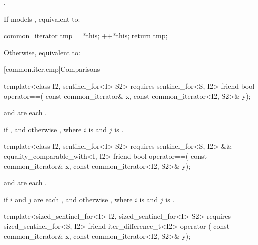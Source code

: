 \begin{itemdescr}
\pnum
\expects
{}.

\pnum
\effects
If  models , equivalent to:
\begin{codeblock}
common_iterator tmp = *this;
++*this;
return tmp;
\end{codeblock}
Otherwise, equivalent to: 
\end{itemdescr}

[common.iter.cmp]{Comparisons}

%
\begin{itemdecl}
template<class I2, sentinel_for<I> S2>
  requires sentinel_for<S, I2>
friend bool operator==(
  const common_iterator& x, const common_iterator<I2, S2>& y);
\end{itemdecl}

\begin{itemdescr}
\pnum
\expects
{} and 
are each .

\pnum
\returns
{} if ,
and otherwise ,
where $i$ is  and $j$ is .
\end{itemdescr}

%
\begin{itemdecl}
template<class I2, sentinel_for<I> S2>
  requires sentinel_for<S, I2> && equality_comparable_with<I, I2>
friend bool operator==(
  const common_iterator& x, const common_iterator<I2, S2>& y);
\end{itemdecl}

\begin{itemdescr}
\pnum
\expects
{} and 
are each .

\pnum
\returns
{} if $i$ and $j$ are each , and otherwise
, where
$i$ is  and $j$ is .
\end{itemdescr}

%
\begin{itemdecl}
template<sized_sentinel_for<I> I2, sized_sentinel_for<I> S2>
  requires sized_sentinel_for<S, I2>
friend iter_difference_t<I2> operator-(
  const common_iterator& x, const common_iterator<I2, S2>& y);
\end{itemdecl}

